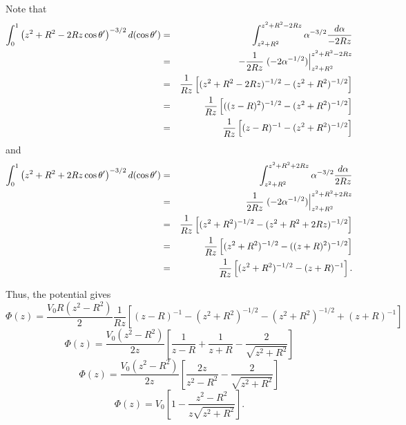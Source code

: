 Note that
\begin{eqnarray}
\int_0^1   \left( z^2+ R^2- 2 Rz \cos \theta ' \right)^{-3/2}  d(\cos \theta ') &=& \int_{z^2 + R^2}^{z^2 + R^2 - 2Rz} \alpha^{-3/2} \frac{d\alpha }{-2Rz} \notag \\
&=& -\frac{1}{2Rz}  \left. (-2\alpha^{-1/2} ) \right|_{z^2 + R^2}^{z^2 + R^2 - 2Rz}  \notag \\
&=& \frac{1}{Rz} \left[ (z^2 + R^2 - 2Rz)^{-1/2} - (z^2 + R^2)^{-1/2}  \right]  \notag \\
&=& \frac{1}{Rz} \left[ ((z-R)^2)^{-1/2} - (z^2 + R^2)^{-1/2}  \right] \notag \\
&=& \frac{1}{Rz} \left[ (z-R)^{-1} - (z^2 + R^2)^{-1/2}  \right] \notag
\end{eqnarray}
and 
\begin{eqnarray}
\int_0^1   \left( z^2+ R^2 + 2 Rz \cos \theta ' \right)^{-3/2}  d(\cos \theta ') &=& \int_{z^2 + R^2}^{z^2 + R^2 + 2Rz} \alpha^{-3/2} \frac{d\alpha }{2Rz} \notag \\
&=& \frac{1}{2Rz}  \left. (-2\alpha^{-1/2} ) \right|_{z^2 + R^2}^{z^2 + R^2 + 2Rz}  \notag \\
&=& \frac{1}{Rz} \left[ (z^2 + R^2)^{-1/2} -(z^2 + R^2 + 2Rz)^{-1/2} \right]  \notag \\
&=& \frac{1}{Rz} \left[ (z^2 + R^2)^{-1/2} -((z+R)^2)^{-1/2} \right]  \notag \\
&=& \frac{1}{Rz} \left[ (z^2 + R^2)^{-1/2} -(z+R)^{-1} \right] . \notag 
\end{eqnarray}

Thus, the potential gives
\begin{equation}
\Phi (z) = \frac{V_0 R \left(  z^2- R^2 \right)}{2}     \frac{1}{Rz}   \left[ (z-R)^{-1} - (z^2 + R^2)^{-1/2}  -  (z^2 + R^2)^{-1/2} +(z+R)^{-1} \right]  
\end{equation}
\begin{equation}
\Phi (z) = \frac{V_0  \left(  z^2- R^2 \right)}{2z}    \left[ \frac{1}{z-R} + \frac{1}{z+R} - \frac{2}{\sqrt{z^2 + R^2}} \right] 
\end{equation}
\begin{equation}
\Phi (z ) = \frac{V_0  \left(  z^2- R^2 \right)}{2z}  \left[ \frac{2z}{z^2-R^2} - \frac{2}{\sqrt{z^2 + R^2} } \right] 
\end{equation}
\begin{equation}
\Phi (z ) = V_0 \left[ 1 - \frac{z^2-R^2}{z\sqrt{z^2 + R^2} } \right].
\end{equation}

